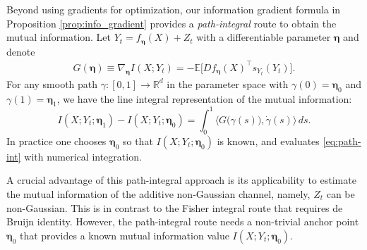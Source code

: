 \documentclass[conference]{IEEEtran}
\begin{document}
Beyond using gradients for optimization, 
our information gradient formula in Proposition \ref{prop:info_gradient} provides a
\emph{path-integral} route 
to obtain the mutual information.
Let $Y_t=f_{\bm\eta}(X)+Z_t$ with 
a differentiable parameter $\bm\eta$ and denote
\begin{align}
G(\bm\eta) \equiv \nabla_{\bm\eta} I(X;Y_t)
=-\mathbb{E}\!\big[D f_{\bm\eta}(X)^\top s_{Y_t}(Y_t)\big].
\end{align}
For any smooth
path $\gamma:[0,1]\!\to\!\mathbb{R}^d$ in the parameter space with $\gamma(0)=\bm\eta_0$ and
$\gamma(1)=\bm\eta_1$, we have the line integral representation of the mutual information:
\begin{equation}
\label{eq:path-int}
I(X;Y_t;\bm\eta_1)-I(X;Y_t;\bm\eta_0)
=\int_0^1 \big\langle G\big(\gamma(s)\big),\dot\gamma(s)\big\rangle\,ds.
\end{equation}
In practice one chooses $\bm\eta_0$ so that $I(X;Y_t;\bm\eta_0)$ is known, 
and evaluates
\eqref{eq:path-int} with numerical integration. 

A crucial advantage of this path-integral approach is its applicability
to estimate the mutual information of the additive non-Gaussian channel,
namely, $Z_t$ can be non-Gaussian.
This is in contrast to the Fisher integral route that requires de Bruijn identity.
However, the path-integral route needs a non-trivial anchor point $\bm\eta_0$ that 
provides a known mutual information value $I(X;Y_t;\bm\eta_0)$.

\end{document}
